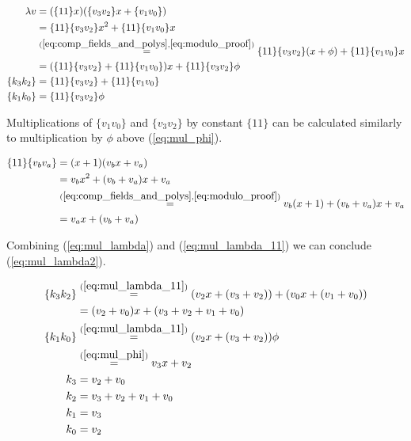 \begin{equation}
\label{eq:mul_lambda}
\begin{aligned}
\lambda v &= (\{11\}x) (\{v_3v_2\}x + \{v_1v_0\})\\
&= \{11\}\{v_3v_2\}x^2 + \{11\}\{v_1v_0\}x\\
&\stackrel{(\ref{eq:comp_fields_and_polys}, \ref{eq:modulo_proof})}{=}
\{11\}\{v_3v_2\}(x + \phi) + \{11\}\{v_1v_0\}x \\
&= (\{11\}\{v_3v_2\} + \{11\}\{v_1v_0\})x + \{11\}\{v_3v_2\}\phi\\
\{k_3k_2\} &= \{11\}\{v_3v_2\} + \{11\}\{v_1v_0\}\\
\{k_1k_0\} &= \{11\}\{v_3v_2\}\phi
\end{aligned}
\end{equation}

Multiplications of $\{v_1v_0\}$ and $\{v_3v_2\}$ by constant $\{11\}$ can be calculated similarly to multiplication by $\phi$ above (\ref{eq:mul_phi}).

\begin{equation}
\label{eq:mul_lambda_11}
\begin{aligned}
\{11\}\{v_bv_a\} &= (x + 1)(v_bx + v_a)\\
&= v_bx^2 + (v_b + v_a)x + v_a \\
&\stackrel{(\ref{eq:comp_fields_and_polys}, \ref{eq:modulo_proof})}{=}
v_b(x + 1) + (v_b + v_a)x + v_a \\
&= v_ax + (v_b + v_a)
\end{aligned}
\end{equation}

Combining (\ref{eq:mul_lambda}) and (\ref{eq:mul_lambda_11}) we can conclude (\ref{eq:mul_lambda2}).

\begin{equation}
\label{eq:mul_lambda2}
\begin{aligned}
\{k_3k_2\}
&\stackrel{(\ref{eq:mul_lambda_11})}{=}
(v_2x + (v_3 + v_2)) + (v_0x + (v_1 + v_0)) \\
&= (v_2 + v_0)x + (v_3 + v_2 + v_1 + v_0)\\
\{k_1k_0\}
&\stackrel{(\ref{eq:mul_lambda_11})}{=}
(v_2x + (v_3 + v_2))\phi \\
&\stackrel{(\ref{eq:mul_phi})}{=}
v_3x + v_2\\
k_3 &= v_2 + v_0\\
k_2 &= v_3 + v_2 + v_1 + v_0\\
k_1 &= v_3\\
k_0 &= v_2
\end{aligned}
\end{equation}


